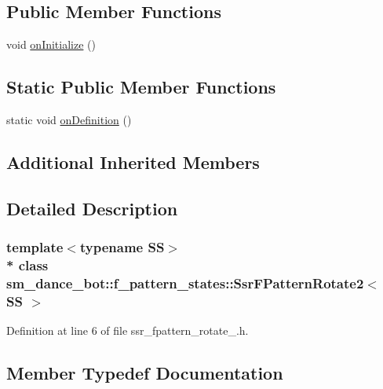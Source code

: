 \subsection*{Public Member Functions}
\begin{DoxyCompactItemize}
\item 
void \hyperlink{structsm__dance__bot_1_1f__pattern__states_1_1SsrFPatternRotate2_ac81a4b79e4301ab6972a7417c7a038a0}{on\+Initialize} ()
\end{DoxyCompactItemize}
\subsection*{Static Public Member Functions}
\begin{DoxyCompactItemize}
\item 
static void \hyperlink{structsm__dance__bot_1_1f__pattern__states_1_1SsrFPatternRotate2_a94984af075136acc7a3f19b5641065d0}{on\+Definition} ()
\end{DoxyCompactItemize}
\subsection*{Additional Inherited Members}


\subsection{Detailed Description}
\subsubsection*{template$<$typename SS$>$\\*
class sm\+\_\+dance\+\_\+bot\+::f\+\_\+pattern\+\_\+states\+::\+Ssr\+F\+Pattern\+Rotate2$<$ S\+S $>$}



Definition at line 6 of file ssr\+\_\+fpattern\+\_\+rotate\+\_.\+h.



\subsection{Member Typedef Documentation}
